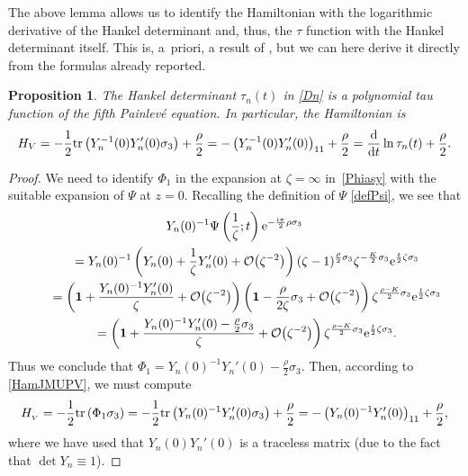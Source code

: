 \documentclass[10pt,a4paper]{amsart}
\numberwithin{equation}{section}
\newtheorem{Proposition}[Theorem]{Proposition}
\theoremstyle{definition}
\def\tr{{\rm tr}}
\def\le{\left}
\def\ri{\right}
\def \d{{\mathrm d}}
\def \1{\mathbf 1}
\def\s{\sigma}
\begin{document}
The above lemma allows us to identify the Hamiltonian with the logarithmic derivative of the Hankel determinant and, thus, the $\tau$ function with the Hankel determinant itself. This is, a~priori, a result of \cite{Bertola:Semiiso}, but we can here derive it directly from the formulas already reported.
\begin{Proposition}\label{tauPV}
The Hankel determinant $\tau_n(t)$ in \eqref{Dn} is a polynomial tau function of the fifth Painlev\'e equation. In particular, the Hamiltonian is
\[
H_V = -\frac 1 2 \tr \le(Y_n^{-1}(0) Y'_n(0) \s_3\ri) + \frac { {\rho}} 2 =-
\le(Y_n^{-1}(0) Y'_n(0) \ri)_{11} + \frac { {\rho}} 2 = \frac {\d}{\d t} \ln \tau_n(t) + \frac { {\rho}} 2.
\]
\end{Proposition}
\begin{proof}
We need to identify $\Phi_1$ in the expansion at $\zeta=\infty$ in~\eqref{Phiasy} with the suitable expansion of $\Psi$ at $z=0$. Recalling the definition of $\Psi $ \eqref{defPsi}, we see that
\begin{gather*}
Y_n(0)^{-1}\Psi\le(\frac 1 \zeta;t\ri) {\rm e}^{-\frac {{\rm i}\pi}2 { {\rho}} \s_3}\\
\qquad
=
 Y_n(0)^{-1}\le(Y_n(0) + \frac 1 \zeta Y_n'(0) + \mathcal O\bigl(\zeta^{-2}\bigr)\ri)
(\zeta-1)^{\frac { {\rho}} 2 \s_3} \zeta ^{-\frac { {K}} 2 \s_3} {\rm e}^{\frac t 2 \zeta \s_3}\\
\qquad=\le(\1 + \frac {Y_n(0)^{-1} Y_n'(0)}\zeta + \mathcal O\bigl(\zeta ^{-2}\bigr)\ri)
 \le( \1 - \frac {{ {\rho}}}{2\zeta}\s_3 + \mathcal O\bigl(\zeta ^{-2}\bigr)\ri)
 \zeta^{\frac {{ {\rho}}-{ {K}}}2\s_3}
 {\rm e}^{\frac t 2 \zeta \s_3}\\
\qquad=\le(\1 + \frac { Y_n(0)^{-1} Y_n'(0) - \frac { {\rho}} 2\s_3}\zeta + \mathcal O\bigl(\zeta ^{-2}\bigr)\ri) \zeta^{\frac {{ {\rho}}-{ {K}}}2\s_3} {\rm e}^{\frac t 2 \zeta \s_3}.
\end{gather*}
Thus we conclude that
$
\Phi_1 = Y_n(0)^{-1} Y_n'(0) - \frac { {\rho}} 2\s_3$.
Then, according to \eqref{HamJMUPV}, we must compute
\[
H_{_V}=-\frac 1 2 \tr \le(\Phi_1\s_3\ri) = -\frac 1 2 \tr \le( Y_n(0)^{-1} Y_n'(0) \s_3\ri) + \frac { {\rho}} 2
=-\le( Y_n(0)^{-1} Y_n'(0) \ri) _{11} + \frac { {\rho}} 2,
\]
where we have used that $Y_n(0)Y_n'(0)$ is a traceless matrix (due to the fact that $\det Y_n \equiv 1$).


\end{proof}
\end{document}
